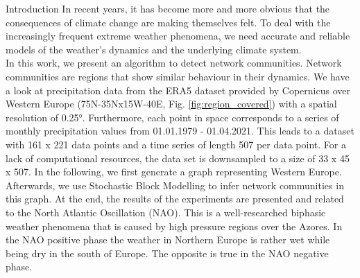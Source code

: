 \documentclass[12pt]{article}
\title{\vskip-3em \bf 
    Climate Network Communities for Precipitation Data
    }
\author{
    A Summary Written by Johannes Schulz and Adrian Stock \\
    \texttt{johannes.schulz@student.uni-tuebingen.de} \\
    \texttt{adrian.stock@student.uni-tuebingen.de}
}
\date{\it Machine Learning Approaches in Climate Science\\Summer Term 2021}
\begin{document}
\maketitle
\thispagestyle{empty}

\newpage
{}

\begin{comment}
    \begin{abstract}\vskip-1.5em \noindent
        We looked at different papers that detected network communities on climate data \citep*{community_structure,complex,exploration}.
        To implement the stochastic block model, we used the pysbm package \citep{sbms}.
    \end{abstract}
\end{comment}

\begin{section}{Introduction}
In recent years, it has become more and more obvious that the consequences of climate change are making themselves felt. To deal with the increasingly frequent extreme weather phenomena, we need accurate and reliable models of the weather's dynamics and the underlying climate system. \\
In this work, we present an algorithm to detect network communities. Network communities are regions that show similar behaviour in their dynamics. We have a look at precipitation data from the ERA5 dataset provided by Copernicus \citep{hersbach2019era5} over Western Europe (75N-35Nx15W-40E, Fig. \ref{fig:region_covered}) with a spatial resolution of 0.25°. Furthermore, each point in space corresponds to a series of monthly precipitation values from 01.01.1979 - 01.04.2021. This leads to a dataset with 161 x 221 data points and a time series of length 507 per data point. For a lack of computational resources, the data set is downsampled to a size of 33 x 45 x 507. In the following, we first generate a graph representing Western Europe. Afterwards, we use Stochastic Block Modelling to infer network communities in this graph. At the end, the results of the experiments are presented and related to the North Atlantic Oscillation (NAO). This is a well-researched biphasic weather phenomena that is caused by high pressure regions over the Azores. In the NAO positive phase the weather in Northern Europe is rather wet while being dry in the south of Europe. The opposite is true in the NAO negative phase.
\end{section}
\end{document}

